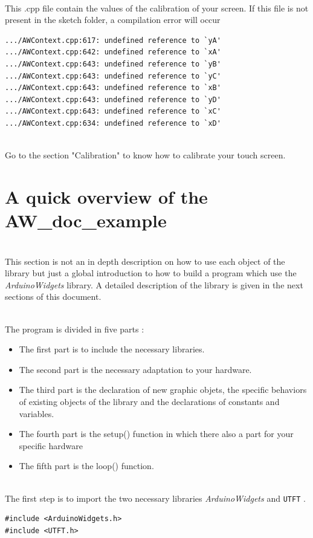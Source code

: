 \documentclass[a4paper,11pt]{extarticle}
\begin{document}
~\\ This .cpp file contain the values of the calibration of your screen.
If this file is not present in the sketch folder, a compilation error will occur

\begin{lstlisting}[language=Arduinonl]
.../AWContext.cpp:617: undefined reference to `yA'
.../AWContext.cpp:642: undefined reference to `xA'
.../AWContext.cpp:643: undefined reference to `yB'
.../AWContext.cpp:643: undefined reference to `yC'
.../AWContext.cpp:643: undefined reference to `xB'
.../AWContext.cpp:643: undefined reference to `yD'
.../AWContext.cpp:643: undefined reference to `xC'
.../AWContext.cpp:634: undefined reference to `xD'
\end{lstlisting}

~\\ Go to the section "Calibration" to know how to calibrate your touch screen.

\newpage
\section{A quick overview of the AW\_doc\_example}

~\\This section is not an in depth description on how to use each object of the library but just a global introduction to how to build a program which use the \emph{ArduinoWidgets} library. A detailed description of the library is given in the next sections of this document.

~\\ The program is divided in five parts :
\begin{itemize}
  \item The first part is to include the necessary libraries.
  \item The second part is the necessary adaptation to your hardware.
  \item The third part is the declaration of new graphic objets, the specific behaviors of existing objects of the library and the declarations of constants and variables.
  \item The fourth part is the setup() function in which there also a part for your specific hardware
  \item The fifth part is the loop() function.
\end{itemize}

~\\The first step is to import the two necessary libraries \emph{ArduinoWidgets} and \texttt{UTFT} .
\begin{lstlisting}[language=Arduinonl]
#include <ArduinoWidgets.h>
#include <UTFT.h>
\end{lstlisting}
\end{document}
